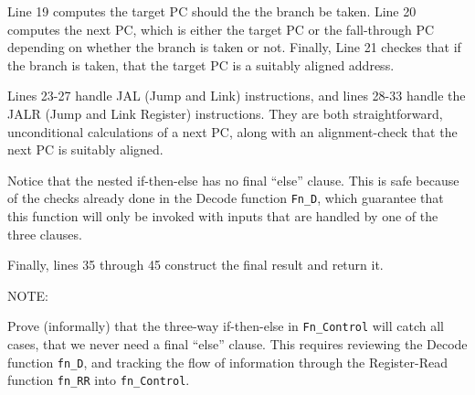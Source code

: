 Line 19 computes the target PC should the the branch be taken.  Line
20 computes the next PC, which is either the target PC or the
fall-through PC depending on whether the branch is taken or not.
Finally, Line 21 checkes that if the branch is taken, that the target
PC is a suitably aligned address.

Lines 23-27 handle JAL (Jump and Link) instructions, and lines 28-33
handle the JALR (Jump and Link Register) instructions.  They are both
straightforward, unconditional calculations of a next PC, along with
an alignment-check that the next PC is suitably aligned.

Notice that the nested if-then-else has no final ``else'' clause.
This is safe because of the checks already done in the Decode function
\verb|Fn_D|, which guarantee that this function will only be invoked
with inputs that are handled by one of the three clauses.

Finally, lines 35 through 45 construct the final result and return it.

\vspace*{2ex}

NOTE:

\vspace*{2ex}

\hdivider

\Exercise

Prove (informally) that the three-way if-then-else in
\verb|Fn_Control| will catch all cases, {\ie} that we never need a
final ``else'' clause.  This requires reviewing the Decode function
\verb|fn_D|, and tracking the flow of information through the
Register-Read function \verb|fn_RR| into \verb|fn_Control|.

